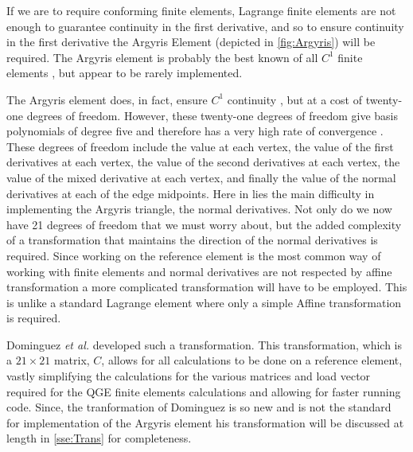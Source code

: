 If we are to require conforming finite elements, Lagrange finite elements are
not enough to guarantee continuity in the first derivative, and so to ensure
continuity in the first derivative \cite{Johnson} the Argyris Element (depicted
in \autoref{fig:Argyris}) will be required. The Argyris element is probably the
best known of all $C^1$ finite elements \cite{Argyris,Dominguez08}, but appear
to be rarely implemented.



The Argyris element does, in fact, ensure $C^1$ continuity
\cite{Dominguez08,Okabe}, but at a cost of twenty-one degrees of freedom.
However, these twenty-one degrees of freedom give basis polynomials of degree
five and therefore has a very high rate of convergence \cite{Dominguez08}.
These degrees of freedom include the value at each vertex, the value of the
first derivatives at each vertex, the value of the second derivatives at each
vertex, the value of the mixed derivative at each vertex, and finally the value
of the normal derivatives at each of the edge midpoints. Here in lies the main
difficulty in implementing the Argyris triangle, the normal derivatives. Not
only do we now have 21 degrees of freedom that we must worry about, but the
added complexity of a transformation that maintains the direction of the normal
derivatives is required. Since working on the reference element is the most
common way of working with finite elements and normal derivatives are not
respected by affine transformation a more complicated transformation will have
to be employed. This is unlike a standard Lagrange element where only a simple
Affine transformation is required. \cite{Dominguez08}

Dominguez \emph{et al.} developed such a transformation. This transformation,
which is a $21 \times 21$ matrix, $C$, allows for all calculations to be done on
a reference element, vastly simplifying the calculations for the various
matrices and load vector required for the QGE finite elements calculations and
allowing for faster running code. Since, the tranformation of Dominguez is so
new and is not the standard for implementation of the Argyris element his
transformation will be discussed at length in \autoref{sse:Trans} for
completeness.
